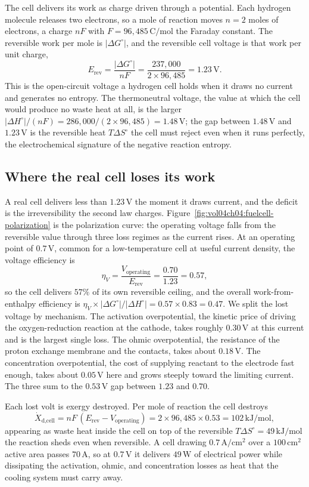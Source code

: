The cell delivers its work as charge driven through a potential. Each hydrogen
molecule releases two electrons, so a mole of reaction moves $n = 2$ moles of
electrons, a charge $nF$ with $F = 96{,}485\,\text{C}/\text{mol}$ the Faraday
constant. The reversible work per mole is $|\Delta G^\circ|$, and the reversible
cell voltage is that work per unit charge,
\[
E_{\text{rev}} = \frac{|\Delta G^\circ|}{nF}
= \frac{237{,}000}{2 \times 96{,}485}
= 1.23\,\text{V}.
\]
This is the open-circuit voltage a hydrogen cell holds when it draws no current
and generates no entropy. The thermoneutral voltage, the value at which the cell
would produce no waste heat at all, is the larger
$|\Delta H^\circ|/(nF) = 286{,}000/(2\times96{,}485) = 1.48\,\text{V}$; the gap
between $1.48\,\text{V}$ and $1.23\,\text{V}$ is the reversible heat
$T\Delta S^\circ$ the cell must reject even when it runs perfectly, the
electrochemical signature of the negative reaction entropy.

\subsection{Where the real cell loses its work}

A real cell delivers less than $1.23\,\text{V}$ the moment it draws current,
and the deficit is the irreversibility the second law charges.
Figure~\ref{fig:vol04ch04:fuelcell-polarization} is the polarization curve: the
operating voltage falls from the reversible value through three loss regimes as
the current rises. At an operating point of $0.7\,\text{V}$, common for a
low-temperature cell at useful current density, the voltage efficiency is
\[
\eta_V = \frac{V_{\text{operating}}}{E_{\text{rev}}}
= \frac{0.70}{1.23} = 0.57,
\]
so the cell delivers $57\%$ of its own reversible ceiling, and the overall
work-from-enthalpy efficiency is $\eta_V \times |\Delta G^\circ|/|\Delta H^\circ|
= 0.57 \times 0.83 = 0.47$. We split the lost voltage by mechanism. The
activation overpotential, the kinetic price of driving the oxygen-reduction
reaction at the cathode, takes roughly $0.30\,\text{V}$ at this current and is
the largest single loss. The ohmic overpotential, the resistance of the proton
exchange membrane and the contacts, takes about $0.18\,\text{V}$. The
concentration overpotential, the cost of supplying reactant to the electrode
fast enough, takes about $0.05\,\text{V}$ here and grows steeply toward the
limiting current. The three sum to the $0.53\,\text{V}$ gap between $1.23$ and
$0.70$.

Each lost volt is exergy destroyed. Per mole of reaction the cell destroys
\[
\dot X_{\text{d,cell}} = nF\,(E_{\text{rev}} - V_{\text{operating}})
= 2 \times 96{,}485 \times 0.53
= 102\,\text{kJ}/\text{mol},
\]
appearing as waste heat inside the cell on top of the reversible
$T\Delta S^\circ = 49\,\text{kJ}/\text{mol}$ the reaction sheds even when
reversible. A cell drawing $0.7\,\text{A}/\text{cm}^2$ over a $100\,\text{cm}^2$
active area passes $70\,\text{A}$, so at $0.7\,\text{V}$ it delivers
$49\,\text{W}$ of electrical power while dissipating the activation, ohmic, and
concentration losses as heat that the cooling system must carry away.

